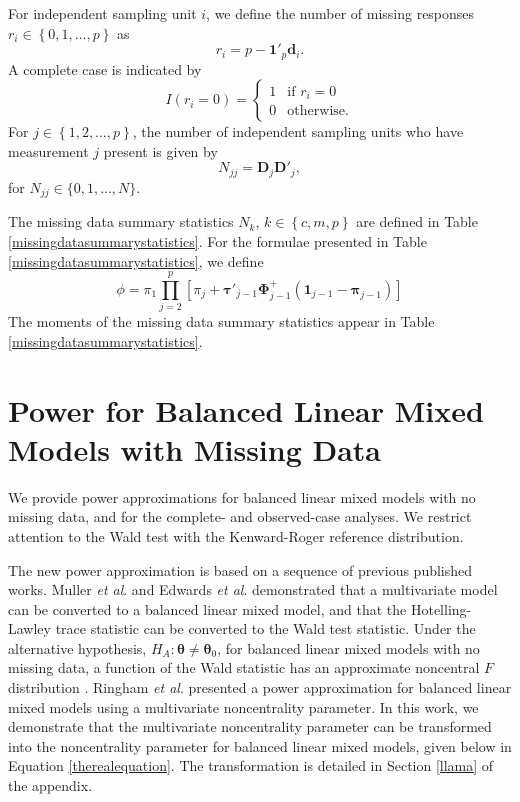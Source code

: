 \documentclass[11pt]{article}
\begin{document}
For independent sampling unit $i$, we define the number of missing responses $r_{i}\in\left\{0,1,\ldots,p\right\}$ as 
\begin{equation}
r_{i}=p-\boldsymbol{1}'_{p}\boldsymbol{d}_{i}.
\end{equation}
A complete case is indicated by 
\begin{equation}
I\left(r_{i}=0\right)=
\begin{cases}
1&\text{if }r_{i}=0\\
0&\text{otherwise.}
\end{cases}
\end{equation}
For $j\in\left\{1,2,\ldots,p\right\}$, the number of independent sampling units who have measurement $j$ present is given by
\begin{equation}
N_{jj}=\boldsymbol{D}_{j}\boldsymbol{D}'_{j},
\end{equation}
for $N_{jj}\in\{0,1,\ldots,N\}$.

The missing data summary statistics $N_{k}$, $k\in\left\{c,m,p\right\}$ are defined in Table \ref{missingdatasummarystatistics}. For the formulae presented in Table \ref{missingdatasummarystatistics}, we define
\begin{equation}
\phi = \pi_{1}\prod_{j=2}^{p}\left[\pi_{j}+\boldsymbol{\tau}'_{j-1}\boldsymbol{\Phi}^{+}_{j-1}\left(\boldsymbol{1}_{j-1}-\boldsymbol{\pi}_{j-1}\right)\right]
\end{equation}
The moments of the missing data summary statistics appear in Table \ref{missingdatasummarystatistics}.

\section{Power for Balanced Linear Mixed Models with Missing Data}
\label{power}

We provide power approximations for balanced linear mixed models with no missing data, and for the complete- and observed-case analyses. We restrict attention to the Wald test with the Kenward-Roger \cite{kenward_small_1997, kenward_improved_2009} reference distribution. 

The new power approximation is based on a sequence of previous published works. Muller \textit{et al}. \cite{muller_statistical_2007} and Edwards \textit{et al}. \cite{edwards_r2_2008} demonstrated that a multivariate model can be converted to a balanced linear mixed model, and that the Hotelling-Lawley trace statistic can be converted to the Wald test statistic. Under the alternative hypothesis, $H_{A}:\boldsymbol{\theta}\neq\boldsymbol{\theta}_{0}$, for balanced linear mixed models with no missing data, a function of the Wald statistic has an approximate noncentral $F$ distribution \cite{edwards_r2_2008}. Ringham \textit{et al}. \cite{ringham_multivariate_2016} presented a power approximation for balanced linear mixed models using a multivariate noncentrality parameter. In this work, we demonstrate that the multivariate noncentrality parameter \cite{ringham_multivariate_2016} can be transformed into the noncentrality parameter for balanced linear mixed models, given below in Equation \ref{therealequation}. The transformation is detailed in Section \ref{llama} of the appendix.
\end{document}
